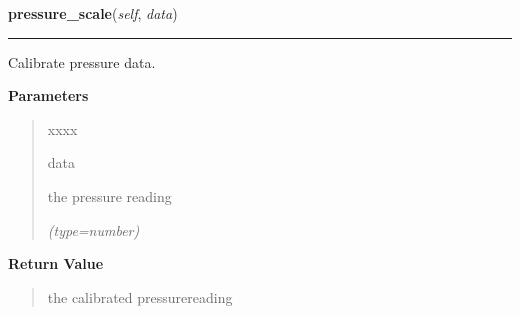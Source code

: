 \hspace{.8\funcindent}\begin{boxedminipage}{\funcwidth}

    \raggedright \textbf{pressure\_scale}(\textit{self}, \textit{data})

    \vspace{-1.5ex}

    \rule{\textwidth}{0.5\fboxrule}
\setlength{\parskip}{2ex}
    Calibrate pressure data.

\setlength{\parskip}{1ex}
      \textbf{Parameters}
      \vspace{-1ex}

      \begin{quote}
        \begin{Ventry}{xxxx}

          \item[data]

          the pressure reading

            {\it (type=number)}

        \end{Ventry}

      \end{quote}

      \textbf{Return Value}
    \vspace{-1ex}

      \begin{quote}
      the calibrated pressurereading

      \end{quote}

    \end{boxedminipage}

    \label{sensor_thread:Sensor:read_data}

    \vspace{0.5ex}

